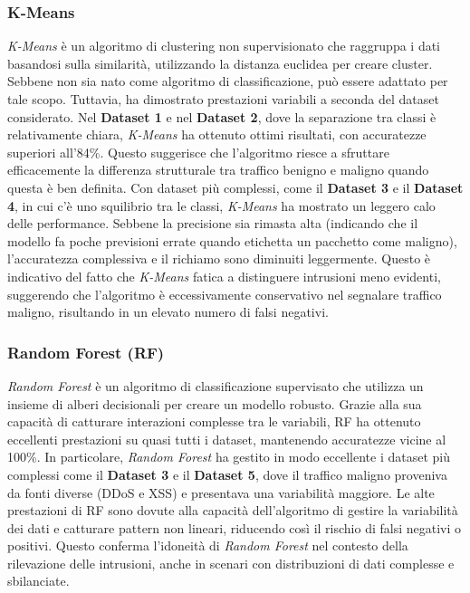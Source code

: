 \subsubsection{K-Means}
\textit{K-Means} è un algoritmo di clustering non supervisionato che raggruppa i dati basandosi sulla similarità, utilizzando la distanza euclidea per creare cluster. Sebbene non sia nato come algoritmo di classificazione, può essere adattato per tale scopo. Tuttavia, ha dimostrato prestazioni variabili a seconda del dataset considerato.
Nel \textbf{Dataset 1} e nel \textbf{Dataset 2}, dove la separazione tra classi è relativamente chiara, \textit{K-Means} ha ottenuto ottimi risultati, con accuratezze superiori all'84\%. Questo suggerisce che l'algoritmo riesce a sfruttare efficacemente la differenza strutturale tra traffico benigno e maligno quando questa è ben definita.
Con dataset più complessi, come il \textbf{Dataset 3} e il \textbf{Dataset 4}, in cui c'è uno squilibrio tra le classi, \textit{K-Means} ha mostrato un leggero calo delle performance. Sebbene la precisione sia rimasta alta (indicando che il modello fa poche previsioni errate quando etichetta un pacchetto come maligno), l'accuratezza complessiva e il richiamo sono diminuiti leggermente. Questo è indicativo del fatto che \textit{K-Means} fatica a distinguere intrusioni meno evidenti, suggerendo che l'algoritmo è eccessivamente conservativo nel segnalare traffico maligno, risultando in un elevato numero di falsi negativi.

\subsubsection{Random Forest (RF)}
\textit{Random Forest} è un algoritmo di classificazione supervisato che utilizza un insieme di alberi decisionali per creare un modello robusto. Grazie alla sua capacità di catturare interazioni complesse tra le variabili, RF ha ottenuto eccellenti prestazioni su quasi tutti i dataset, mantenendo accuratezze vicine al 100\%.
In particolare, \textit{Random Forest} ha gestito in modo eccellente i dataset più complessi come il \textbf{Dataset 3} e il \textbf{Dataset 5}, dove il traffico maligno proveniva da fonti diverse (DDoS e XSS) e presentava una variabilità maggiore. Le alte prestazioni di RF sono dovute alla capacità dell'algoritmo di gestire la variabilità dei dati e catturare pattern non lineari, riducendo così il rischio di falsi negativi o positivi. Questo conferma l'idoneità di \textit{Random Forest} nel contesto della rilevazione delle intrusioni, anche in scenari con distribuzioni di dati complesse e sbilanciate.


